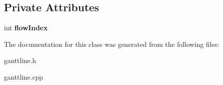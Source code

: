 \subsection*{Private Attributes}
\begin{DoxyCompactItemize}
\item 
\hypertarget{class_gantt_line_afdc3b8ef93711d3a20dce12d50b4460f}{}int {\bfseries flow\+Index}\label{class_gantt_line_afdc3b8ef93711d3a20dce12d50b4460f}

\end{DoxyCompactItemize}


The documentation for this class was generated from the following files\+:\begin{DoxyCompactItemize}
\item 
ganttline.\+h\item 
ganttline.\+cpp\end{DoxyCompactItemize}
